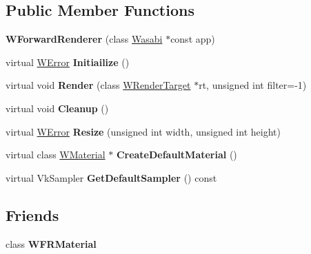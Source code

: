\subsection*{Public Member Functions}
\begin{DoxyCompactItemize}
\item 
{\bfseries W\+Forward\+Renderer} (class \hyperlink{class_wasabi}{Wasabi} $\ast$const app)\hypertarget{class_w_forward_renderer_a5153c67bdb9b27ca6cb683332f4cea9c}{}\label{class_w_forward_renderer_a5153c67bdb9b27ca6cb683332f4cea9c}

\item 
virtual \hyperlink{class_w_error}{W\+Error} {\bfseries Initiailize} ()\hypertarget{class_w_forward_renderer_a629fa8adb89dace7868ba870206ac5f0}{}\label{class_w_forward_renderer_a629fa8adb89dace7868ba870206ac5f0}

\item 
virtual void {\bfseries Render} (class \hyperlink{class_w_render_target}{W\+Render\+Target} $\ast$rt, unsigned int filter=-\/1)\hypertarget{class_w_forward_renderer_a69b90655513cd29f21c1dea9b2a1b706}{}\label{class_w_forward_renderer_a69b90655513cd29f21c1dea9b2a1b706}

\item 
virtual void {\bfseries Cleanup} ()\hypertarget{class_w_forward_renderer_a54e3da7b8e7b57fc7f20c82f43d6519b}{}\label{class_w_forward_renderer_a54e3da7b8e7b57fc7f20c82f43d6519b}

\item 
virtual \hyperlink{class_w_error}{W\+Error} {\bfseries Resize} (unsigned int width, unsigned int height)\hypertarget{class_w_forward_renderer_ace5e40731639f412ee0c1989b5e750e0}{}\label{class_w_forward_renderer_ace5e40731639f412ee0c1989b5e750e0}

\item 
virtual class \hyperlink{class_w_material}{W\+Material} $\ast$ {\bfseries Create\+Default\+Material} ()\hypertarget{class_w_forward_renderer_a54c58c8760eee602d9838db91c55be58}{}\label{class_w_forward_renderer_a54c58c8760eee602d9838db91c55be58}

\item 
virtual Vk\+Sampler {\bfseries Get\+Default\+Sampler} () const \hypertarget{class_w_forward_renderer_a0be96132cc36349dcfa6d71cdb846ffd}{}\label{class_w_forward_renderer_a0be96132cc36349dcfa6d71cdb846ffd}

\end{DoxyCompactItemize}
\subsection*{Friends}
\begin{DoxyCompactItemize}
\item 
class {\bfseries W\+F\+R\+Material}\hypertarget{class_w_forward_renderer_ad8978519eb6a5884691ce33a6c0b33ee}{}\label{class_w_forward_renderer_ad8978519eb6a5884691ce33a6c0b33ee}

\end{DoxyCompactItemize}
